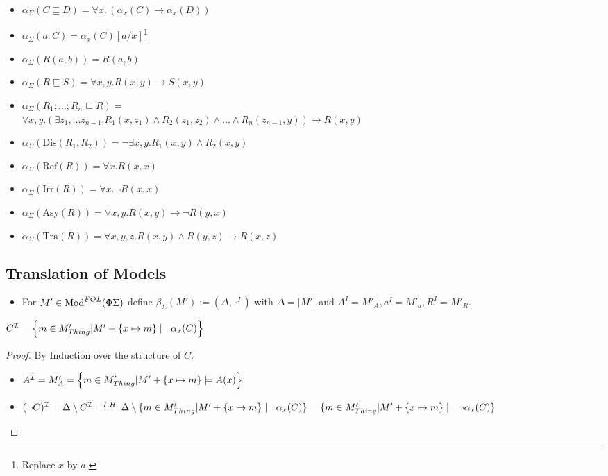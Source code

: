 \documentclass[10pt,fleqn,%
\ifpretendfinal
final%
\else
draft%
\fi,
]{scrreprt}
\newcommand{\ssclause}[1]{\subsection{#1}}
\begin{document}
\begin{itemize}
 \item $\alpha_\Sigma (C \sqsubseteq D) = \forall x.\, (\alpha_x(C) \rightarrow \alpha_x(D))$
 \item $\alpha_\Sigma (a:C) = \alpha_x(C)[a/x]$\footnote{Replace $x$ by $a$.}
 \item $\alpha_\Sigma (R(a,b)) = R(a,b)$
 \item $\alpha_\Sigma (R \sqsubseteq S) = \forall x, y. R(x,y) \rightarrow S(x,y) $
 \item $\alpha_\Sigma (R_1; \ldots; R_n \sqsubseteq R) =$\\
$ \forall x,y . (\exists z_1,\ldots z_{n-1} . R_1(x,z_1) \wedge R_2(z_1,z_2) \wedge \ldots \wedge R_n(z_{n-1},y)) \rightarrow R(x,y) $
 \item $\alpha_\Sigma (\text{Dis}(R_1,R_2)) = \neg\exists x,y . R_1(x,y)\wedge R_2(x,y)$	
 \item $\alpha_\Sigma (\text{Ref}(R)) = \forall x. R(x,x)$
 \item $\alpha_\Sigma (\text{Irr}(R)) = \forall x. \neg R(x,x)$
 \item $\alpha_\Sigma (\text{Asy}(R)) = \forall x,y . R(x,y) \rightarrow \neg R(y,x)$
 \item $\alpha_\Sigma (\text{Tra}(R)) = \forall x,y,z . R(x,y) \wedge R(y,z) \rightarrow R(x,z)$
\end{itemize}





\ssclause{Translation of Models}

\begin{itemize}
	\item For $M' \in \text{Mod}^{FOL}(\Phi \Sigma)$ define $\beta_\Sigma(M') := (\Delta, \cdot^I)$
	with $\Delta = |M'|$ and $A^I = M'_A, a^I = M'_a, R^I = M'_R$.
\end{itemize}

	\begin{proposition}
$C^{\mathcal{I}} = \left\{m \in M'_{{Thing} } \lvert M' + \{x \mapsto m \} \models \alpha_x (C) \right\}$
	\end{proposition}
	
	\begin{proof} By Induction over the structure of $C$.
\begin{itemize}
	\item $A^{\mathcal{I}} = M'_A = \left \{m \in M'_{{Thing} } \vert M' + \{x \mapsto m \} \models A(x)  \right\}$
	\item $(\lnot C)^{\mathcal{I}} = \Delta \setminus C^{\mathcal{I}} =^{I.H.} \Delta \setminus \{m \in M'_{Thing}  \lvert M' + \{x \mapsto m\} \models \alpha_x(C)\} = \{m \in M'_{Thing}  \vert M' + \{x \mapsto m\} \models \lnot \alpha_x(C)\}$
\end{itemize}
	\end{proof}
\end{document}
